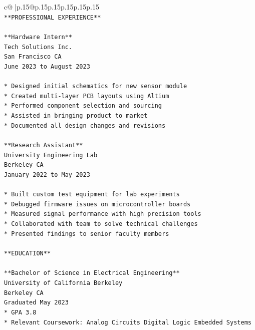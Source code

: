 \documentclass{article}
\begin{document}
{\begin{supertabular}{c@{$\;$}|p{.15\linewidth}@{}p{.15\linewidth}p{.15\linewidth}p{.15\linewidth}p{.15\linewidth}p{.15\linewidth}}
{{{\\ 
\texttt{**PROFESSIONAL EXPERIENCE**} \\
\\ 
\texttt{**Hardware Intern**} \\
\texttt{Tech Solutions Inc.} \\
\texttt{San Francisco CA} \\
\texttt{June 2023 to August 2023} \\
\\ 
\texttt{*   Designed initial schematics for new sensor module} \\
\texttt{*   Created multi{-}layer PCB layouts using Altium} \\
\texttt{*   Performed component selection and sourcing} \\
\texttt{*   Assisted in bringing product to market} \\
\texttt{*   Documented all design changes and revisions} \\
\\ 
\texttt{**Research Assistant**} \\
\texttt{University Engineering Lab} \\
\texttt{Berkeley CA} \\
\texttt{January 2022 to May 2023} \\
\\ 
\texttt{*   Built custom test equipment for lab experiments} \\
\texttt{*   Debugged firmware issues on microcontroller boards} \\
\texttt{*   Measured signal performance with high precision tools} \\
\texttt{*   Collaborated with team to solve technical challenges} \\
\texttt{*   Presented findings to senior faculty members} \\
\\ 
\texttt{**EDUCATION**} \\
\\ 
\texttt{**Bachelor of Science in Electrical Engineering**} \\
\texttt{University of California Berkeley} \\
\texttt{Berkeley CA} \\
\texttt{Graduated May 2023} \\
\texttt{*   GPA 3.8} \\
\texttt{*   Relevant Coursework: Analog Circuits Digital Logic Embedded Systems} \\
\\ 
}}}
\end{supertabular}}
\end{document}
